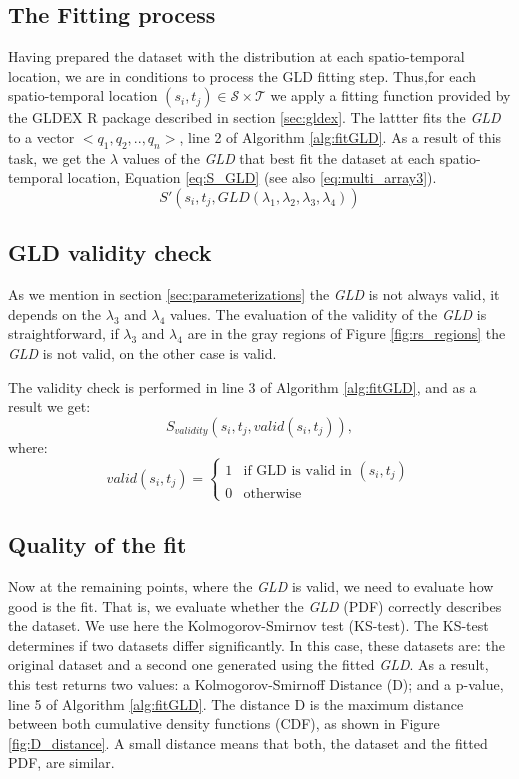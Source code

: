 \subsection{The Fitting process}
\label{gldFitProcess}
Having prepared the dataset with the distribution at each spatio-temporal location, we are in conditions to process the GLD fitting step. Thus,for each spatio-temporal location $(s_{i},t_{j}) \in \mathcal{S} \times \mathcal{T}$ we apply a fitting function provided by the GLDEX R package described in section \ref{sec:gldex}. The lattter fits the \textit{GLD} to a vector $<q_1,q_2,..,q_n>$, line 2 of Algorithm \ref{alg:fitGLD}. As a result of this task, we get the $\lambda$ values of the \textit{GLD} that best fit the dataset at each spatio-temporal location, Equation \ref{eq:S_GLD} (see also \ref{eq:multi_array3}).
\begin{equation}\label{eq:S_GLD}
S'(s_{i},t_{j},GLD(\lambda_{1}, \lambda_{2}, \lambda_{3}, \lambda_{4}))
\end{equation}

\subsection{GLD validity check}
As we mention in section \ref{sec:parameterizations} the \textit{GLD} is not always valid, it depends on the $\lambda_{3}$  and $\lambda_{4}$ values. The evaluation of the validity of the \textit{GLD} is straightforward, if $\lambda_{3}$  and $\lambda_{4}$ are in the gray regions of Figure \ref{fig:rs_regions} the \textit{GLD} is not valid, on the other case is valid.

The validity check is performed in line 3 of Algorithm \ref{alg:fitGLD}, and as a result we get:
\begin{equation}
S_{validity}(s_{i},t_{j},valid(s_{i},t_{j})),
\end{equation}
where:
\begin{equation}
 \label{eq:validitycheck}
  valid(s_{i},t_{j}) =
  \begin{cases}
    1 & \text{if GLD is valid in $(s_{i},t_{j})$} \\
    0 & \text{otherwise}
  \end{cases}
\end{equation}

\subsection{Quality of the fit}
\label{Quality of the fit}
Now at the remaining points, where the \textit{GLD} is valid, we need to evaluate how good is the fit. That is, we evaluate whether the \textit{GLD} (PDF) correctly describes the dataset. We use here the Kolmogorov-Smirnov test (KS-test). The KS-test  determines if two datasets differ significantly. In this case, these datasets are: the original dataset and a second one generated using the fitted \textit{GLD}. As a result, this test returns two values: a Kolmogorov-Smirnoff Distance (D); and a p-value, line 5 of Algorithm \ref{alg:fitGLD}. The distance D is the maximum distance between both cumulative density functions (CDF), as shown in Figure \ref{fig:D_distance}. A small distance means that both, the dataset and the fitted PDF, are similar. 


